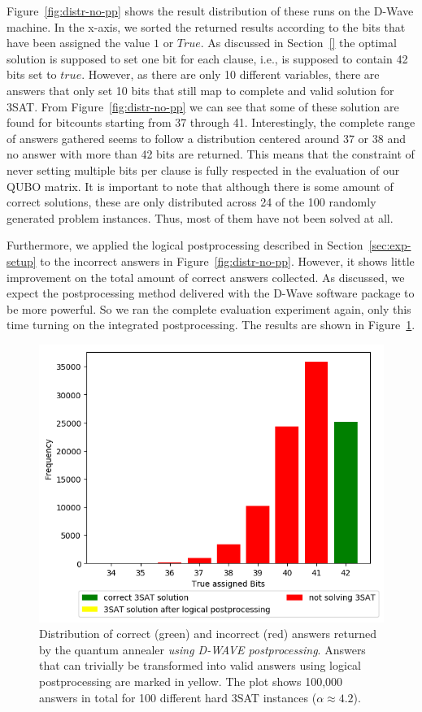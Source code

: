 Figure~\ref{fig:distr-no-pp} shows the result distribution of these runs on the D-Wave machine. In the x-axis, we sorted the returned results according to the bits that have been assigned the value $1$ or $\textit{True}$. As discussed in Section~\ref{} the optimal solution is supposed to set one bit for each clause, i.e., is supposed to contain 42 bits set to $\textit{true}$. However, as there are only 10 different variables, there are answers that only set 10 bits that still map to complete and valid solution for 3SAT. From Figure~\ref{fig:distr-no-pp} we can see that some of these solution are found for bitcounts starting from 37 through 41. Interestingly, the complete range of answers gathered seems to follow a distribution centered around $37$ or $38$ and no answer with more than 42 bits are returned. This means that the constraint of never setting multiple bits per clause is fully respected in the evaluation of our QUBO matrix. It is important to note that although there is some amount of correct solutions, these are only distributed across 24 of the 100 randomly generated problem instances. Thus,  most of them have not been solved at all.

Furthermore, we applied the logical postprocessing described in Section~\ref{sec:exp-setup} to the incorrect answers in Figure~\ref{fig:distr-no-pp}. However, it shows little improvement on the total amount of correct answers collected. As discussed, we expect the postprocessing method delivered with the D-Wave software package to be more powerful. So we ran the complete evaluation experiment again, only this time turning on the integrated postprocessing. The results are shown in Figure~\ref{fig:distr-yes-pp}.

\begin{figure}[t]
\centering
\includegraphics[width=.8\textwidth]{../material_2/Plots/42_4_2_opt_engl_color_mit_transform.png}
\caption{Distribution of correct (green) and incorrect (red) answers returned by the quantum annealer \emph{using D-WAVE postprocessing}. Answers that can trivially be transformed into valid answers using logical postprocessing are marked in yellow. The plot shows 100,000 answers in total for 100 different hard 3SAT instances ($\alpha \approx 4.2$).}
\label{fig:distr-yes-pp}
\end{figure}

